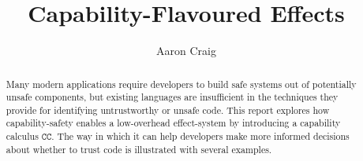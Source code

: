 \documentclass[11pt, a4paper, twoside, openright]{report}
\title{Capability-Flavoured Effects}
\author{Aaron Craig}
\date{}
\newcommand{\kwa}[1]{\mathtt{#1}}
\newcommand{\epscalc}{\kwa{CC}}
\begin{document}
\frontmatter





\begin{abstract}
  Many modern applications require developers to build safe systems
  out of potentially unsafe components, but existing languages are
  insufficient in the techniques they provide for identifying
  untrustworthy or unsafe code. This report explores how
  capability-safety enables a low-overhead effect-system
  by introducing a capability calculus $\epscalc$. The way in which
  it can help developers make more informed decisions
  about whether to trust code is illustrated with several examples.
  
\end{abstract}







\maketitle



\tableofcontents



\mainmatter










%


\end{document}
